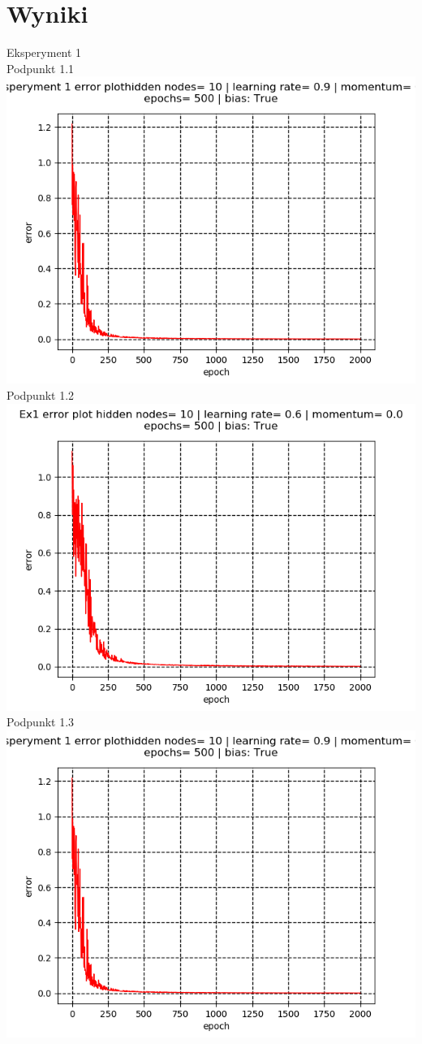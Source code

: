 \documentclass{classrep}
\begin{document}
\section{Wyniki}
{Eksperyment 1\\
Podpunkt 1.1\\
\includegraphics{11.png}\\
Podpunkt 1.2\\
\includegraphics{12.png}\\
Podpunkt 1.3\\
\includegraphics{11.png}\\
}
\end{document}
